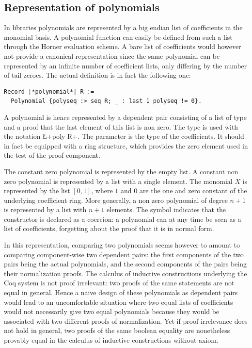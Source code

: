 \documentclass{mscs}
\begin{document}
\subsection{Representation of polynomials}\label{ssec:polys}
In \ssr{} libraries 
polynomials are represented by a big endian list of coefficients in
the monomial basis. A polynomial function can easily be defined from
such a list through the Horner evaluation scheme.
A bare list of coefficients would however not
provide a canonical representation since the same
polynomial can be represented by an infinite number of coefficient
lists, only differing by the number of tail zeroes. The actual
definition is in fact the following one:
\begin{lstlisting}
Record |*polynomial*| R :=
  Polynomial {polyseq :> seq R; _ : last 1 polyseq != 0}.
\end{lstlisting}
A polynomial is hence
represented by a dependent pair consisting of a list  of
type  and a
proof that the last element of this list is non zero. The type
 is used with the notation \L+{poly R}+. The
parameter  is the type of the coefficients. It should in fact
be equipped with a ring structure, which provides the zero element
used in the test of the proof component.

The constant zero polynomial is represented by the empty list. A
constant non zero polynomial is represented by a list with a single
element. The monomial $X$ is represented
by the list $[0, 1]$, where $1$ and $0$ are the one and zero
constant of the underlying coefficient ring.
More generally, a non zero polynomial of degree $n+1$ is
represented by a list with $n+1$ elements. The \C{:>} symbol indicates
that the  constructor is declared as a coercion: a
polynomial can at any time be seen as a list of coefficients,
forgetting about the proof that it is in normal form.

In this representation, comparing two polynomials seems however to
amount to comparing component-wise two dependent pairs: the first
components of
the two pairs being the actual polynomials, and the second components
of the pairs being their normalization proofs.  The calculus of
inductive constructions underlying the Coq system is not proof
irrelevant: two proofs of the same statements are not equal in
general. Hence a naive design of these polynomials as dependent pairs
would lead to an uncomfortable situation where two equal lists of
coefficients would not necessarily give two equal polynomials because
they would be associated with two different proofs of normalization. Yet if
proof irrelevance does not hold in general, two proofs of the same
boolean equality are nonetheless provably equal in the calculus of
inductive constructions without axiom.
\end{document}
